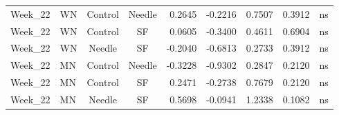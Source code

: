 \documentclass[
  12pt,
  letterpaper,
]{article}
\begin{document}
\begin{longtable}{llccrrrlc}
Week\_22 & WN & Control & Needle & 0.2645 & -0.2216 & 0.7507 & 0.3912 & ns \\ 
Week\_22 & WN & Control & SF & 0.0605 & -0.3400 & 0.4611 & 0.6904 & ns \\ 
Week\_22 & WN & Needle & SF & -0.2040 & -0.6813 & 0.2733 & 0.3912 & ns \\ 
Week\_22 & MN & Control & Needle & -0.3228 & -0.9302 & 0.2847 & 0.2120 & ns \\ 
Week\_22 & MN & Control & SF & 0.2471 & -0.2738 & 0.7679 & 0.2120 & ns \\ 
Week\_22 & MN & Needle & SF & 0.5698 & -0.0941 & 1.2338 & 0.1082 & ns \\ 
\bottomrule
\end{longtable}
\endgroup

\begingroup
\fontsize{12.0pt}{14.4pt}\selectfont
\end{document}
